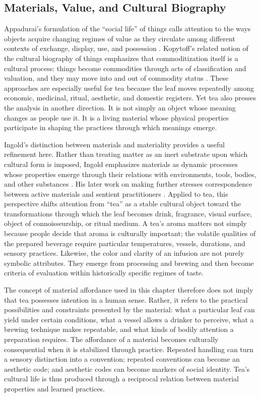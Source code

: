 \documentclass[numbers]{IntechOpen-Book}
\begin{document}
\subsection{Materials, Value, and Cultural Biography}

Appadurai's formulation of the ``social life'' of things calls attention to the ways objects acquire changing regimes of value as they circulate among different contexts of exchange, display, use, and possession \cite{appadurai1986}. Kopytoff's related notion of the cultural biography of things emphasizes that commoditization itself is a cultural process: things become commodities through acts of classification and valuation, and they may move into and out of commodity status \cite{kopytoff1986}. These approaches are especially useful for tea because the leaf moves repeatedly among economic, medicinal, ritual, aesthetic, and domestic registers. Yet tea also presses the analysis in another direction. It is not simply an object whose meaning changes as people use it. It is a living material whose physical properties participate in shaping the practices through which meanings emerge.

Ingold's distinction between materials and materiality provides a useful refinement here. Rather than treating matter as an inert substrate upon which cultural form is imposed, Ingold emphasizes materials as dynamic processes whose properties emerge through their relations with environments, tools, bodies, and other substances \cite{ingold2007}. His later work on making further stresses correspondence between active materials and sentient practitioners \cite{ingold2013}. Applied to tea, this perspective shifts attention from ``tea'' as a stable cultural object toward the transformations through which the leaf becomes drink, fragrance, visual surface, object of connoisseurship, or ritual medium. A tea's aroma matters not simply because people decide that aroma is culturally important; the volatile qualities of the prepared beverage require particular temperatures, vessels, durations, and sensory practices. Likewise, the color and clarity of an infusion are not purely symbolic attributes. They emerge from processing and brewing and then become criteria of evaluation within historically specific regimes of taste.

The concept of material affordance used in this chapter therefore does not imply that tea possesses intention in a human sense. Rather, it refers to the practical possibilities and constraints presented by the material: what a particular leaf can yield under certain conditions, what a vessel allows a drinker to perceive, what a brewing technique makes repeatable, and what kinds of bodily attention a preparation requires. The affordance of a material becomes culturally consequential when it is stabilized through practice. Repeated handling can turn a sensory distinction into a convention; repeated conventions can become an aesthetic code; and aesthetic codes can become markers of social identity. Tea's cultural life is thus produced through a reciprocal relation between material properties and learned practices.
\end{document}
